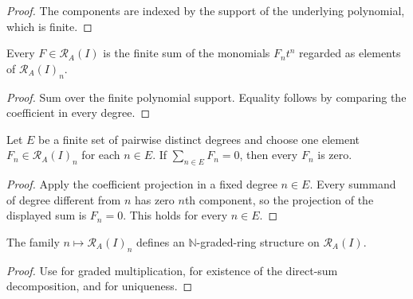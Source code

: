 \begin{proof}
  The components are indexed by the support of the underlying polynomial,
  which is finite.
\end{proof}

\begin{lemma}
  \label{lemma:nagata-rees-sum-components}

  Every $F\in\mathcal R_A(I)$ is the finite sum of the monomials
  $F_nt^n$ regarded as elements of $\mathcal R_A(I)_n$.
\end{lemma}

\begin{proof}
  Sum over the finite polynomial support.  Equality follows by comparing the
  coefficient in every degree.
\end{proof}

\begin{lemma}
  \label{lemma:nagata-rees-components-unique}

  Let $E$ be a finite set of pairwise distinct degrees and choose one element
  $F_n\in\mathcal R_A(I)_n$ for each $n\in E$.  If
  $\sum_{n\in E}F_n=0$, then every $F_n$ is zero.
\end{lemma}

\begin{proof}
  Apply the coefficient projection in a fixed degree $n\in E$.  Every summand
  of degree different from $n$ has zero $n$th component, so the projection of
  the displayed sum is $F_n=0$.  This holds for every $n\in E$.
\end{proof}

\begin{proposition}
  \label{prop:nagata-rees-graded}

  The family $n\mapsto\mathcal R_A(I)_n$ defines an
  $\mathbb N$-graded-ring structure on $\mathcal R_A(I)$.
\end{proposition}

\begin{proof}
  Use  for graded multiplication,
   for existence of the direct-sum
  decomposition, and  for
  uniqueness.
\end{proof}

